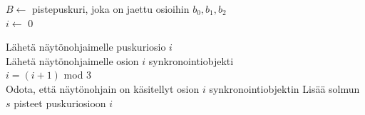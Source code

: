 \perusalgoritmi


$B \gets$ pistepuskuri, joka on jaettu osioihin $b_0, b_1, b_2$\\
$i \gets$ 0

 {
     {
        Lähetä näytönohjaimelle puskuriosio $i$\\
        Lähetä näytönohjaimelle osion $i$ synkronointiobjekti\\
        $i = (i + 1)$ mod $3$\\
        Odota, että näytönohjain on käsitellyt osion $i$ synkronointiobjektin
    }
     {
        Lisää solmun $s$ pisteet puskuriosioon $i$
    }
}